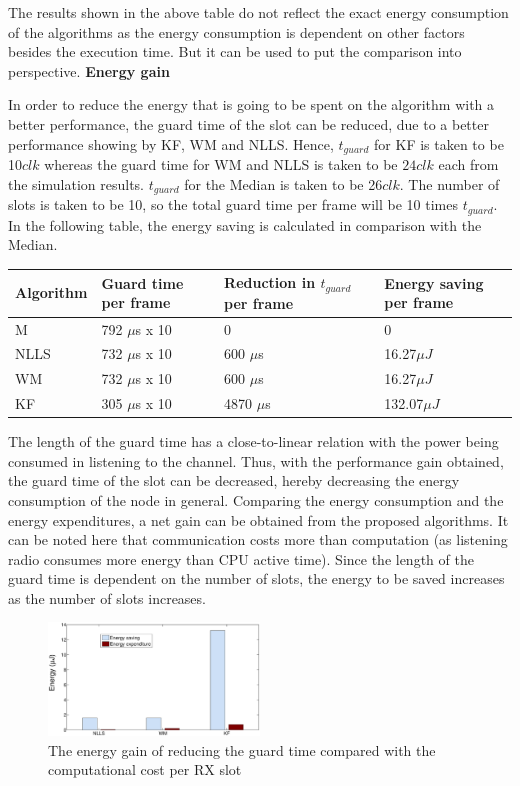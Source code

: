 \documentclass[journal]{IEEEtran}
\begin{document}
The results shown in the above table do not reflect the exact energy consumption of the algorithms as the energy consumption is dependent on other factors besides the execution time. But it can be used to put the comparison into perspective. \newline
\textbf{Energy gain}\par \noindent
In order to reduce the energy that is going to be spent on the algorithm with a better performance, the guard time of the slot can be reduced, due to a better performance showing by KF, WM and NLLS.
Hence, $t_{guard}$ for KF is taken to be 10$clk$ whereas the guard time for WM and NLLS is taken to be $24clk$ each from the simulation results. $t_{guard}$ for the Median is taken to be 26$clk$. The number of slots is taken to be 10, so the total guard time per frame will be 10 times $t_{guard}$. In the following table, the energy saving is calculated in comparison with the Median.
\begin{center}
    \begin{tabular}{ |p{1.5cm} | p{2cm} |p{2cm} | p{1.75cm} |  }
    \hline \hline
    Algorithm & Guard time per frame & Reduction in $t_{guard}$ per frame & Energy saving per frame\\ \hline
   M &  792 $\mu$s x 10 & 0 & 0 \\ \hline
    NLLS & 732 $\mu$s x 10 & 600 $\mu$s & 16.27$\mu J$\\ \hline
    WM &   732 $\mu$s x 10 & 600 $\mu$s & 16.27$\mu J$ \\ \hline
    KF &  305 $\mu$s x 10 & 4870 $\mu$s & 132.07$\mu J$\\ \hline
    \end{tabular}
\end{center}
The length of the guard time has a close-to-linear relation with the power being consumed in listening to the channel. Thus, with the performance gain obtained, the guard time of the slot can be decreased, hereby decreasing the energy consumption of the node in general. Comparing the energy consumption and the energy expenditures, a net gain can be obtained from the proposed algorithms. It can be noted here that communication costs more than computation (as listening radio consumes more energy than CPU active time). Since the length of the guard time is dependent on the number of slots, the energy to be saved increases as the number of slots increases.
\begin{figure}
\centering
\includegraphics[width=0.5\textwidth]{commvscompute}
\caption{The energy gain of reducing the guard time compared with
the computational cost per RX slot} \label{guardsave}
\end{figure}
\newline
\newline
\end{document}
